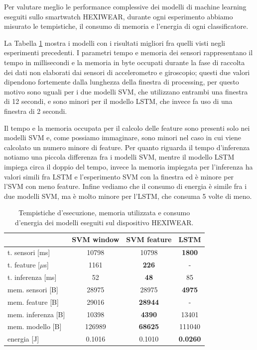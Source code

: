 Per valutare meglio le performance complessive dei modelli di machine learning eseguiti sullo smartwatch HEXIWEAR, durante ogni esperimento abbiamo misurato le tempistiche, il consumo di memoria e l'energia di ogni classificatore.

La Tabella \ref{tab:memory-hexi} mostra i modelli con i risultati migliori fra quelli visti negli esperimenti precedenti. I parametri tempo e memoria dei sensori rappresentano il tempo in millisecondi e la memoria in byte occupati durante la fase di raccolta dei dati non elaborati dai sensori di accelerometro e giroscopio; questi due valori dipendono fortemente dalla lunghezza della finestra di processing, per questo motivo sono uguali per i due modelli SVM, che utilizzano entrambi una finestra di 12 secondi, e sono minori per il modello LSTM, che invece fa uso di una finestra di 2 secondi.

Il tempo e la memoria occupata per il calcolo delle feature sono presenti solo nei modelli SVM e, come possiamo immaginare, sono minori nel caso in cui viene calcolato un numero minore di feature. Per quanto riguarda il tempo d'inferenza notiamo una piccola differenza fra i modelli SVM, mentre il modello LSTM impiega circa il doppio del tempo, invece la memoria impiegata per l'inferenza ha valori simili fra LSTM e l'esperimento SVM con la finestra ed è minore per l'SVM con meno feature. Infine vediamo che il consumo di energia è simile fra i due modelli SVM, ma è molto minore per l'LSTM, che consuma 5 volte di meno.

\begin{table}
    \centering
    \begin{tabular}{l c c c}
        \hline
        & SVM window & SVM feature & LSTM \\
        \hline
        t. sensori [ms] & 10798 & 10798 & \textbf{1800} \\
        t. feature [$\mu$s] & 1161 & \textbf{226} & - \\
        t. inferenza [ms] & 52 & \textbf{48} & 85 \\
        \hline
        mem. sensori [B] & 28975 & 28975 & \textbf{4975} \\
        mem. feature [B] & 29016 & \textbf{28944} & - \\
        mem. inferenza [B] & 10398 & \textbf{4390} & 13401 \\
        mem. modello [B] & 126989 & \textbf{68625} & 111040 \\
        \hline
        energia [J] & 0.1016 & 0.1010 & \textbf{0.0260} \\
        \hline
    \end{tabular}
    \caption{Tempistiche d'esecuzione, memoria utilizzata e consumo d'energia dei modelli eseguiti sul dispositivo HEXIWEAR.}
    \label{tab:memory-hexi}
\end{table}

